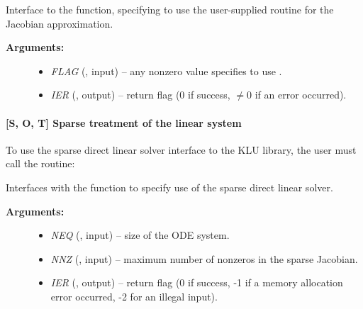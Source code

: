 \documentclass[letterpaper,10pt,english]{sphinxmanual}
\begin{document}
\begin{fulllineitems}
\label{f_interface/Usage:f/_/FARKBANDSETJAC}
Interface to the {\hyperref[c_interface/User_callable:ARKDlsSetBandJacFn]{}} function, specifying
to use the user-supplied routine {\hyperref[f_interface/Usage:f/_/FARKBJAC]{}} for the
Jacobian approximation.
\begin{description}
\item[{\textbf{Arguments:}}] \leavevmode\begin{itemize}
\item {} 
\emph{FLAG} (, input) -- any nonzero value specifies to use
{\hyperref[f_interface/Usage:f/_/FARKBJAC]{}}.

\item {} 
\emph{IER} (, output) -- return flag (0 if success,
$\ne 0$ if an error occurred).

\end{itemize}

\end{description}

\end{fulllineitems}



\paragraph{{[}\textbf{S}, \textbf{O}, \textbf{T}{]} Sparse treatment of the linear system}
\label{f_interface/Usage:s-o-t-sparse-treatment-of-the-linear-system}
To use the sparse direct linear solver interface to the KLU library,
the user must call the {\hyperref[f_interface/Usage:f/_/FARKKLU]{}} routine:

\begin{fulllineitems}
\label{f_interface/Usage:f/_/FARKKLU}
Interfaces with the {\hyperref[c_interface/User_callable:ARKKLU]{}} function to
specify use of the sparse direct linear solver.
\begin{description}
\item[{\textbf{Arguments:}}] \leavevmode\begin{itemize}
\item {} 
\emph{NEQ} (, input) -- size of the ODE system.

\item {} 
\emph{NNZ} (, input) -- maximum number of nonzeros in
the sparse Jacobian.

\item {} 
\emph{IER} (, output) -- return flag (0 if success, -1 if a
memory allocation error occurred, -2 for an illegal input).

\end{itemize}

\end{description}

\end{fulllineitems}
\end{document}
